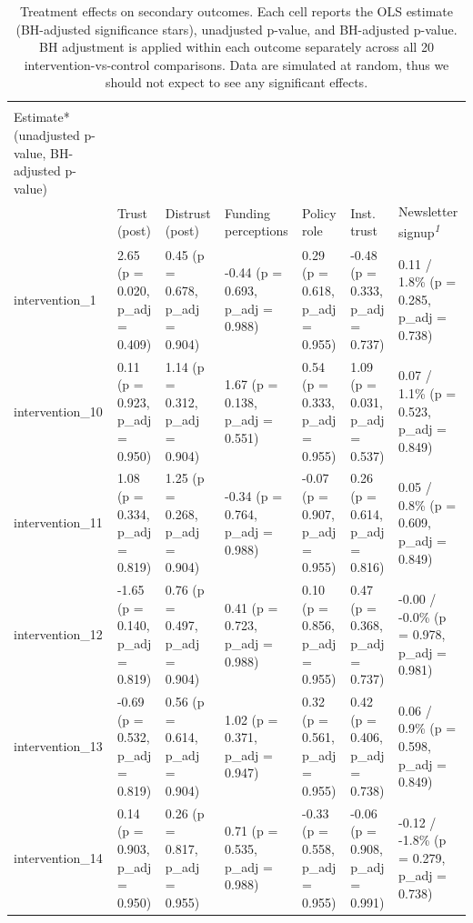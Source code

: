 \documentclass[
  letterpaper,
  DIV=11,
  numbers=noendperiod]{scrartcl}
\begin{document}
\begin{longtable}{l|llllll}

\caption{\label{tbl-main-models-secondary}Treatment effects on secondary
outcomes. Each cell reports the OLS estimate (BH-adjusted significance
stars), unadjusted p-value, and BH-adjusted p-value. BH adjustment is
applied within each outcome separately across all 20
intervention-vs-control comparisons. Data are simulated at random, thus
we should not expect to see any significant effects.}

\tabularnewline

\caption*{
{\large Treatment effects} \\ 
{\small Estimate* (unadjusted p-value, BH-adjusted p-value)}
} \\ 
\toprule
 & Trust (post) & Distrust (post) & Funding perceptions & Policy role & Inst. trust & Newsletter signup\textsuperscript{\textit{1}} \\ 
\midrule\addlinespace[2.5pt]
intervention\_1 & {2.65 (p = 0.020, p\_adj = 0.409)} & {0.45 (p = 0.678, p\_adj = 0.904)} & {-0.44 (p = 0.693, p\_adj = 0.988)} & {0.29 (p = 0.618, p\_adj = 0.955)} & {-0.48 (p = 0.333, p\_adj = 0.737)} & {0.11 / 1.8\% (p = 0.285, p\_adj = 0.738)} \\ 
intervention\_10 & {0.11 (p = 0.923, p\_adj = 0.950)} & {1.14 (p = 0.312, p\_adj = 0.904)} & {1.67 (p = 0.138, p\_adj = 0.551)} & {0.54 (p = 0.333, p\_adj = 0.955)} & {1.09 (p = 0.031, p\_adj = 0.537)} & {0.07 / 1.1\% (p = 0.523, p\_adj = 0.849)} \\ 
intervention\_11 & {1.08 (p = 0.334, p\_adj = 0.819)} & {1.25 (p = 0.268, p\_adj = 0.904)} & {-0.34 (p = 0.764, p\_adj = 0.988)} & {-0.07 (p = 0.907, p\_adj = 0.955)} & {0.26 (p = 0.614, p\_adj = 0.816)} & {0.05 / 0.8\% (p = 0.609, p\_adj = 0.849)} \\ 
intervention\_12 & {-1.65 (p = 0.140, p\_adj = 0.819)} & {0.76 (p = 0.497, p\_adj = 0.904)} & {0.41 (p = 0.723, p\_adj = 0.988)} & {0.10 (p = 0.856, p\_adj = 0.955)} & {0.47 (p = 0.368, p\_adj = 0.737)} & {-0.00 / -0.0\% (p = 0.978, p\_adj = 0.981)} \\ 
intervention\_13 & {-0.69 (p = 0.532, p\_adj = 0.819)} & {0.56 (p = 0.614, p\_adj = 0.904)} & {1.02 (p = 0.371, p\_adj = 0.947)} & {0.32 (p = 0.561, p\_adj = 0.955)} & {0.42 (p = 0.406, p\_adj = 0.738)} & {0.06 / 0.9\% (p = 0.598, p\_adj = 0.849)} \\ 
intervention\_14 & {0.14 (p = 0.903, p\_adj = 0.950)} & {0.26 (p = 0.817, p\_adj = 0.955)} & {0.71 (p = 0.535, p\_adj = 0.988)} & {-0.33 (p = 0.558, p\_adj = 0.955)} & {-0.06 (p = 0.908, p\_adj = 0.991)} & {-0.12 / -1.8\% (p = 0.279, p\_adj = 0.738)} \\ 

\end{longtable}
\end{document}
